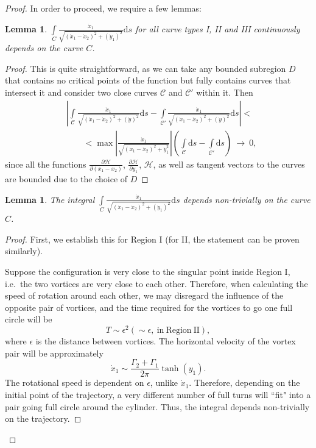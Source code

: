 \documentclass[11pt,twoside]{article}
\newtheorem{lem}[theorem]{Lemma}
\theoremstyle{definition}
\numberwithin{equation}{section}
\begin{document}
\begin{proof}
    In order to proceed, we require a few lemmas:
    \begin{lem}
  $\int\limits_C \frac{\dot{x}_1}{\sqrt{(\dot{x}_1-\dot{x}_2)^2+(\dot{y}_1)^2}}\mathrm{d}s$ for all curve types I, II and III continuously depends on the curve $C$.
  \end{lem}
   \begin{proof}
           This is quite straightforward, as we can take any bounded subregion $D$ that contains no critical points of the function but fully contains curves that intersect it and consider two close curves $\mathcal{C}$ and $\mathcal{C}'$ within it. Then \begin{equation*}
            \begin{split}   
          &\left|\int\limits_{\mathcal{C}} \frac{\dot{x}_1}{\sqrt{(\dot{x}_1-\dot{x}_2)^2+(\dot{y})^2}}\mathrm{d}s - \int\limits_{\mathcal{C}'} \frac{\dot{x}_1}{\sqrt{(\dot{x}_1-\dot{x}_2)^2+(\dot{y})^2}}\mathrm{d}s\right|<\\
          &\qquad<\max\left|\frac{\dot{x}_1}{\sqrt{(\dot{x}_1  - \dot{x}_2)^2  + \dot{y}_1^2}}\right|\left(\int\limits_{\mathcal{C}}\mathrm{d}s - \int\limits_{\mathcal{C}'}\mathrm{d}s \right)\ \to \ 0,
          \end{split}
  \end{equation*}
  since all the functions $\frac{\partial \mathcal{H}}{\partial(x_1-x_2)}$, $\frac{\partial \mathcal{H}}{\partial y_1}$, $\mathcal{H}$, as well as tangent vectors to the curves are bounded due to the choice of $D$
   \end{proof}
   
   \begin{lem}
The integral    $\int\limits_C \frac{\dot{x}_1}{\sqrt{(\dot{x}_1-\dot{x}_2)^2+(\dot{y}_1)^2}}\mathrm{d}s$ depends non-trivially on the curve $C$.
   \end{lem}
   \begin{proof}
           
          First, we establish this for  Region I (for II, the statement can be proven similarly).
           
           Suppose the configuration is very close to the singular point inside Region I, i.e.\  the two vortices are very close to each other. Therefore, when calculating the speed of rotation around each other, we may disregard the influence of the opposite pair of vortices, and the time required for the vortices to go one full circle will be 
           \[
           T \sim\epsilon^2 (\sim \epsilon, \ \mathrm{in  \ Region \ II}),
           \]
           where $\epsilon$ is the distance between vortices. The horizontal velocity of the vortex pair will be approximately            \[
           \dot{x}_1 \sim \frac{\Gamma_2 + \Gamma_1}{2\pi}\tanh(y_1).
           \]
           The rotational speed is dependent on $\epsilon$, unlike $\dot{x}_1$. Therefore, depending on the initial point of the trajectory, a very different number of full turns will ``fit" into a pair going full circle around the cylinder. Thus, the integral depends non-trivially on the trajectory.
          

\end{proof}
\end{proof}
\end{document}
